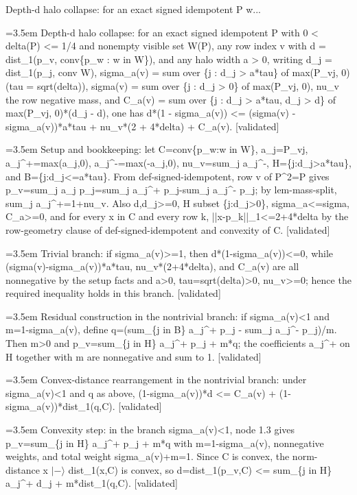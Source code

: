 \documentclass{article}
\newcommand{\step}[1]{\par\noindent\hangindent=3.5em\hangafter=1%
  \makebox[3.5em][l]{\textbf{#1.}}}
\newcommand{\steptag}[1]{\hfill{\small\textsf{[#1]}}}
\begin{document}
\begin{proofbox}{Depth-d halo collapse: for an exact signed idempotent P w...}
\step{1} Depth-d halo collapse: for an exact signed idempotent P with 0 < delta(P) <= 1/4 and nonempty visible set W(P), any row index v with d = dist\_1(p\_v, conv\{p\_w : w in W\}), and any halo width a > 0, writing d\_j = dist\_1(p\_j, conv W), sigma\_a(v) = sum over \{j : d\_j > a*tau\} of max(P\_vj, 0) (tau = sqrt(delta)), sigma(v) = sum over \{j : d\_j > 0\} of max(P\_vj, 0), nu\_v the row negative mass, and C\_a(v) = sum over \{j : d\_j > a*tau, d\_j > d\} of max(P\_vj, 0)*(d\_j - d), one has d*(1 - sigma\_a(v)) <= (sigma(v) - sigma\_a(v))*a*tau + nu\_v*(2 + 4*delta) + C\_a(v). \steptag{validated} \\[6pt]
\step{1.1} Setup and bookkeeping: let C=conv\{p\_w:w in W\}, a\_j=P\_vj, a\_j\textasciicircum{}+=max(a\_j,0), a\_j\textasciicircum{}-=max(-a\_j,0), nu\_v=sum\_j a\_j\textasciicircum{}-, H=\{j:d\_j>a*tau\}, and B=\{j:d\_j<=a*tau\}. From def-signed-idempotent, row v of P\textasciicircum{}2=P gives p\_v=sum\_j a\_j p\_j=sum\_j a\_j\textasciicircum{}+ p\_j-sum\_j a\_j\textasciicircum{}- p\_j; by lem-mass-split, sum\_j a\_j\textasciicircum{}+=1+nu\_v. Also d,d\_j>=0, H subset \{j:d\_j>0\}, sigma\_a<=sigma, C\_a>=0, and for every x in C and every row k, ||x-p\_k||\_1<=2+4*delta by the row-geometry clause of def-signed-idempotent and convexity of C. \steptag{validated} \\[4pt]
\step{1.2} Trivial branch: if sigma\_a(v)>=1, then d*(1-sigma\_a(v))<=0, while (sigma(v)-sigma\_a(v))*a*tau, nu\_v*(2+4*delta), and C\_a(v) are all nonnegative by the setup facts and a>0, tau=sqrt(delta)>0, nu\_v>=0; hence the required inequality holds in this branch. \steptag{validated} \\[4pt]
\step{1.3} Residual construction in the nontrivial branch: if sigma\_a(v)<1 and m=1-sigma\_a(v), define q=(sum\_\{j in B\} a\_j\textasciicircum{}+ p\_j - sum\_j a\_j\textasciicircum{}- p\_j)/m. Then m>0 and p\_v=sum\_\{j in H\} a\_j\textasciicircum{}+ p\_j + m*q; the coefficients a\_j\textasciicircum{}+ on H together with m are nonnegative and sum to 1. \steptag{validated} \\[4pt]
\step{1.4} Convex-distance rearrangement in the nontrivial branch: under sigma\_a(v)<1 and q as above, (1-sigma\_a(v))*d <= C\_a(v) + (1-sigma\_a(v))*dist\_1(q,C). \steptag{validated} \\[6pt]
\step{1.4.1} Convexity step: in the branch sigma\_a(v)<1, node 1.3 gives p\_v=sum\_\{j in H\} a\_j\textasciicircum{}+ p\_j + m*q with m=1-sigma\_a(v), nonnegative weights, and total weight sigma\_a(v)+m=1. Since C is convex, the norm-distance x $|-\rangle$ dist\_1(x,C) is convex, so d=dist\_1(p\_v,C) <= sum\_\{j in H\} a\_j\textasciicircum{}+ d\_j + m*dist\_1(q,C). \steptag{validated} \\[4pt]

\end{proofbox}
\end{document}
